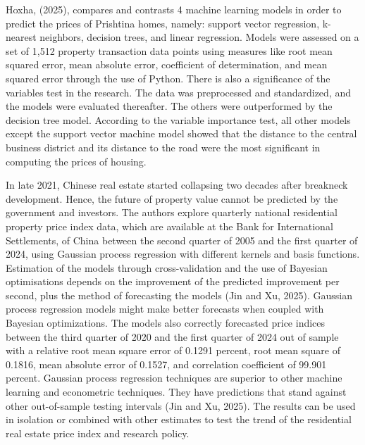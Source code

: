\documentclass[12pt, a4paper, oneside]{book}
\begin{document}
Hoxha, (2025), compares and contrasts 4 machine learning models in order to predict the prices of Prishtina homes, namely: support vector regression, k-nearest neighbors, decision trees, and linear regression. Models were assessed on a set of 1,512 property transaction data points using measures like root mean squared error, mean absolute error, coefficient of determination, and mean squared error through the use of Python. There is also a significance of the variables test in the research. The data was preprocessed and standardized, and the models were evaluated thereafter. The others were outperformed by the decision tree model. According to the variable importance test, all other models except the support vector machine model showed that the distance to the central business district and its distance to the road were the most significant in computing the prices of housing.


In late 2021, Chinese real estate started collapsing two decades after breakneck development. Hence, the future of property value cannot be predicted by the government and investors. The authors explore quarterly national residential property price index data, which are available at the Bank for International Settlements, of China between the second quarter of 2005 and the first quarter of 2024, using Gaussian process regression with different kernels and basis functions. Estimation of the models through cross-validation and the use of Bayesian optimisations depends on the improvement of the predicted improvement per second, plus the method of forecasting the models (Jin and Xu, 2025). Gaussian process regression models might make better forecasts when coupled with Bayesian optimizations. The models also correctly forecasted price indices between the third quarter of 2020 and the first quarter of 2024 out of sample with a relative root mean square error of 0.1291 percent, root mean square of 0.1816, mean absolute error of 0.1527, and correlation coefficient of 99.901 percent. Gaussian process regression techniques are superior to other machine learning and econometric techniques. They have predictions that stand against other out-of-sample testing intervals (Jin and Xu, 2025). The results can be used in isolation or combined with other estimates to test the trend of the residential real estate price index and research policy.
\end{document}
